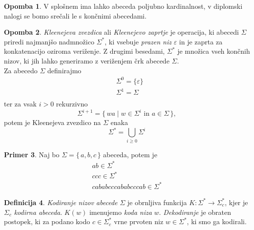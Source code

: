 \documentclass{amsart}
\theoremstyle{definition} %
\newtheorem{definicija}{Definicija}[section]
\newtheorem{primer}[definicija]{Primer}
\newtheorem{opomba}[definicija]{Opomba}
\theoremstyle{plain} %
\begin{document}
\begin{opomba}
    
    V splošnem ima lahko abeceda poljubno kardinalnost, v diplomski nalogi se bomo srečali le
    s končnimi abecedami.
    
\end{opomba}

\begin{opomba}
    
    \textit{Kleenejeva zvezdica} ali \textit{Kleenejevo zaprtje} je operacija, ki
    abecedi $ \Sigma $ priredi najmanjšo nadmnožico $ \Sigma^* $, ki vsebuje
    \textit{prazen niz} $ \varepsilon $ in je zaprta za konkatenacijo oziroma veriženje.
    Z drugimi besedami, $ \Sigma^* $ je množica vseh končnih nizov, ki
    jih lahko generiramo z veriženjem črk abecede $ \Sigma $. \\
    Za abecedo $ \Sigma $ definirajmo
    \begin{align*}
        & \Sigma^0 = \{ \varepsilon \} \\
        & \Sigma^1 = \Sigma \\
    \end{align*}
    ter za vsak $ i > 0 $ rekurzivno
    \[
        \Sigma^{i+1} = \{\, wa \mid w \in \Sigma^i \text{ in } a \in \Sigma \,\},
    \]
    potem je Kleenejeva zvezdico na $ \Sigma $ enaka
    \[
        \Sigma^* = \bigcup_{i \geq 0} \Sigma^i
    \]

\end{opomba}

\begin{primer}
    
    Naj bo $ \Sigma = \{\, a,b,c \,\} $ abeceda, potem je
    \begin{gather*} 
        ab \in \Sigma^* \\
        ccc \in \Sigma^* \\
        cababcccababcccab \in \Sigma^*
    \end{gather*}

\end{primer}

\begin{definicija}
    
    \textit{Kodiranje nizov abecede} $ \Sigma $ je obrnljiva funkcija $ K \colon \Sigma^* \to \Sigma_c^* $,
    kjer je $ \Sigma_c $ \textit{kodirna abeceda}. $ K(w) $ imenujemo \textit{koda niza} $ w $.
    \textit{Dekodiranje} je obraten postopek, ki za podano kodo $ c \in \Sigma_c^* $ vrne prvoten niz
    $ w \in \Sigma^* $, ki smo ga kodirali.

\end{definicija}
\end{document}
